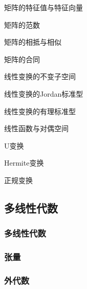 \begin{defination}[矩阵]

\end{defination}

矩阵的特征值与特征向量

矩阵的范数

矩阵的相抵与相似

矩阵的合同

线性变换的不变子空间

线性变换的Jordan标准型

线性变换的有理标准型

线性函数与对偶空间


U变换

Hermite变换

正规变换

\subsection{多线性代数}

\subsubsection{多线性代数}

\begin{defination}[多线性代数]

\end{defination}

\subsubsection{张量}
\label{sec:03}


\begin{defination}[张量]

\end{defination}

\begin{example}[多元函数的任意解导数]

\end{example}


\subsubsection{外代数}
\label{sec:04}
